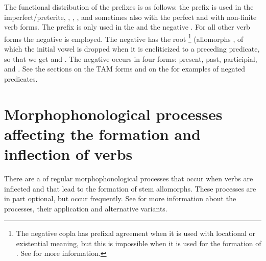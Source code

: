 The functional distribution of the  prefixes is as follows: the prefix  is used in the imperfect/preterite, , , , and sometimes also with the perfect and with non-finite verb forms. The prefix  is only used in the  and the negative . For all other verb forms the negative  is employed. The negative  has the root \footnote{The negative copla has prefixal  agreement when it is used with locational or existential meaning, but this is impossible when it is used for the formation of . See  for more information.} (allomorphs , of which the initial vowel is dropped when it is encliticized to a preceding predicate, so that we get  and . The negative  occurs in four forms: present, past, participial, and . See the sections on the TAM forms and  on the  for examples of negated predicates.



\section[Morphophonological processes affecting verb formation and inflection]{Morphophonological processes affecting the formation and inflection of verbs}
\label{sec:Morphophonological processes affecting the formation and inflection of verbs}

There are a  of regular morphophonological processes that occur when verbs are inflected and that lead to the formation of stem allomorphs. These processes are in part optional, but occur frequently. See  for more information about the processes, their application and alternative variants.

